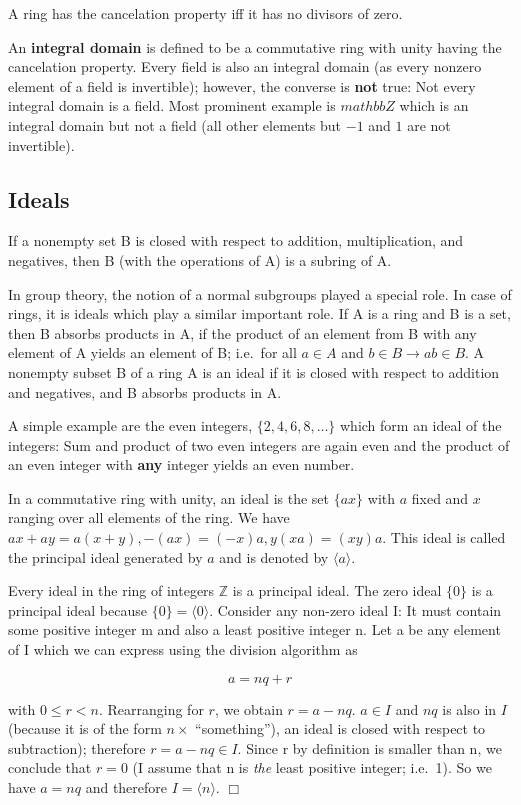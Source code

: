 A ring has the cancelation property iff it has no divisors of zero.

An \textbf{integral domain} is defined to be a commutative ring with
unity having the cancelation property. Every field is also an integral
domain (as every nonzero element of a field is invertible); however, the
converse is \textbf{not} true: Not every integral domain is a field.
Most prominent example is \(mathbb{Z}\) which is an integral domain but
not a field (all other elements but \(-1\) and \(1\) are not
invertible).

\subsection{Ideals}\label{ideals}

If a nonempty set B is closed with respect to addition, multiplication,
and negatives, then B (with the operations of A) is a subring of A.

In group theory, the notion of a normal subgroups played a special role.
In case of rings, it is ideals which play a similar important role. If A
is a ring and B is a set, then B absorbs products in A, if the product
of an element from B with any element of A yields an element of B;
i.e.~for all \(a \in A\) and \(b \in B \rightarrow ab \in B\). A
nonempty subset B of a ring A is an ideal if it is closed with respect
to addition and negatives, and B absorbs products in A.

A simple example are the even integers, \(\{2,4,6,8,\ldots\}\) which
form an ideal of the integers: Sum and product of two even integers are
again even and the product of an even integer with \textbf{any} integer
yields an even number.

In a commutative ring with unity, an ideal is the set \(\{ax\}\) with
\(a\) fixed and \(x\) ranging over all elements of the ring. We have
\(ax + ay = a(x+y), -(ax) = (-x)a, y(xa) = (xy)a\). This ideal is called
the principal ideal generated by \(a\) and is denoted by
\(\langle a \rangle\).

Every ideal in the ring of integers \(\mathbb{Z}\) is a principal ideal.
The zero ideal \(\{0\}\) is a principal ideal because
\(\{0\} = \langle 0 \rangle\). Consider any non-zero ideal I: It must
contain some positive integer m and also a least positive integer n. Let
a be any element of I which we can express using the division algorithm
as

\[
a = nq + r
\]

with \(0 \leq r < n\). Rearranging for \(r\), we obtain \(r = a - nq\).
\(a \in I\) and \(nq\) is also in \(I\) (because it is of the form
\(n \times\) ``something''), an ideal is closed with respect to
subtraction); therefore \(r = a - nq \in I\). Since r by definition is
smaller than n, we conclude that \(r=0\) (I assume that n is \emph{the}
least positive integer; i.e.~1). So we have \(a = nq\) and therefore
\(I = \langle n \rangle\). \(\Box\)

